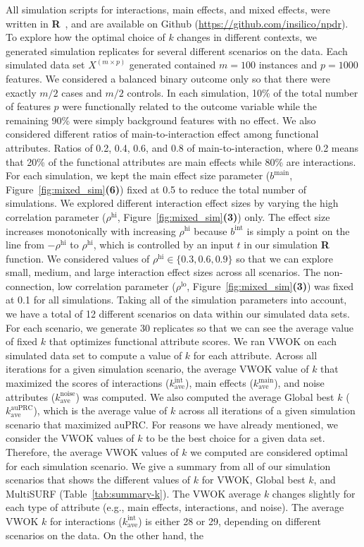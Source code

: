 \documentclass[10pt,letterpaper]{article}
\begin{document}
All simulation scripts for interactions, main effects, and mixed effects, were written in \textbf{\textsf{R}}~\cite{R}, and are available on Github (\url{https://github.com/insilico/npdr}). To explore how the optimal choice of $k$ changes in different contexts, we generated simulation replicates for several different scenarios on the data. Each simulated data set $X^{(m \times p)}$ generated contained $m=100$ instances and $p=1000$ features. We considered a balanced binary outcome only so that there were exactly $m/2$ cases and $m/2$ controls. In each simulation, 10\% of the total number of features $p$ were functionally related to the outcome variable while the remaining 90\% were simply background features with no effect. We also considered different ratios of main-to-interaction effect among functional attributes. Ratios of 0.2, 0.4, 0.6, and 0.8 of main-to-interaction, where 0.2 means that 20\% of the functional attributes are main effects while 80\% are interactions. For each simulation, we kept the main effect size parameter ($b^\text{main}$, Figure~\ref{fig:mixed_sim}\textbf{(6)}) fixed at 0.5 to reduce the total number of simulations. We explored different interaction effect sizes by varying the high correlation parameter ($\rho^\text{hi}$, Figure~\ref{fig:mixed_sim}\textbf{(3)}) only. The effect size increases monotonically with increasing $\rho^\text{hi}$ because $b^\text{int}$ is simply a point on the line from $-\rho^\text{hi}$ to $\rho^\text{hi}$, which is controlled by an input $t$ in our simulation \textbf{\textsf{R}} function. We considered values of $\rho^\text{hi} \in \{0.3,0.6,0.9\}$ so that we can explore small, medium, and large interaction effect sizes across all scenarios. The non-connection, low correlation parameter ($\rho^\text{lo}$, Figure~\ref{fig:mixed_sim}\textbf{(3)}) was fixed at 0.1 for all simulations. Taking all of the simulation parameters into account, we have a total of 12 different scenarios on data within our simulated data sets. For each scenario, we generate 30 replicates so that we can see the average value of fixed $k$ that optimizes functional attribute scores. We ran VWOK on each simulated data set to compute a value of $k$ for each attribute. Across all iterations for a given simulation scenario, the average VWOK value of $k$ that maximized the scores of interactions ($k^\text{int}_\text{ave}$), main effects ($k^\text{main}_\text{ave}$), and noise attributes ($k^\text{noise}_\text{ave}$) was computed. We also computed the average Global best $k$ ($k^\text{auPRC}_\text{ave}$), which is the average value of $k$ across all iterations of a given simulation scenario that maximized auPRC. For reasons we have already mentioned, we consider the VWOK values of $k$ to be the best choice for a given data set. Therefore, the average VWOK values of $k$ we computed are considered optimal for each simulation scenario. We give a summary from all of our simulation scenarios that shows the different values of $k$ for VWOK, Global best $k$, and MultiSURF (Table~\ref{tab:summary-k}). The VWOK average $k$ changes slightly for each type of attribute (e.g., main effects, interactions, and noise). The average VWOK $k$ for interactions ($k^\text{int}_\text{ave}$) is either 28 or 29, depending on different scenarios on the data. On the other hand, the 
\end{document}
